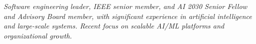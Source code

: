 {\selectfont
	\begin{justify}\textit{Software engineering leader, IEEE senior member, and AI 2030 Senior Fellow and Advisory Board member, with significant experience in artificial intelligence and large-scale systems. Recent focus on scalable AI/ML platforms and organizational growth.}\end{justify}
}
